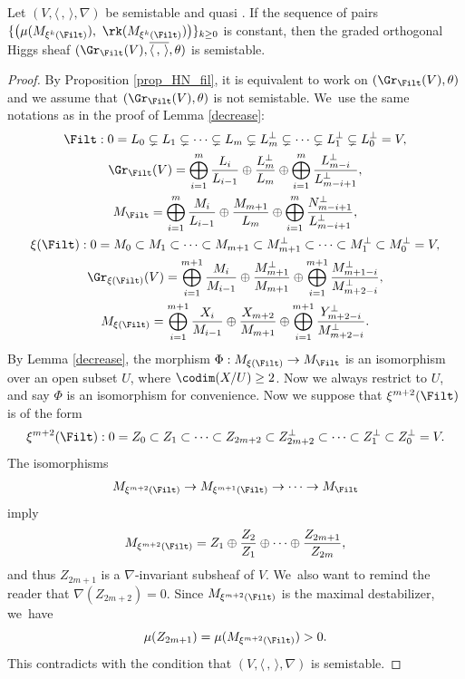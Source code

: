 \begin{lem}\label{lem_const}
Let $(V, \langle \,, \, \rangle, \nabla)$ be semistable and quasi \grsemistable. If the sequence of pairs $\{\big(\mu(M_{\xi^k(\Filt)}),\ \rk(M_{\xi^k(\Filt)})\big)\}_{k\geq 0}$ is constant, then the graded orthogonal Higgs sheaf $(\Gr_{\Filt}(V), \overline{\langle \,, \, \rangle}, \theta)$ is semistable.
\end{lem}

\begin{proof}
By Proposition \ref{prop_HN_fil}, it is equivalent to work on $(\Gr_{\Filt}(V), \theta)$ and we assume that $(\Gr_{\Filt}(V), \theta)$ is not semistable. We~use the same notations as in the proof of Lemma \ref{decrease}:
\begin{gather*}
\Filt: 0= L_0 \subsetneq L_1 \subsetneq \cdots \subsetneq L_m \subsetneq L_m^\perp\subsetneq\cdots \subsetneq L_1^\perp\subsetneq L_0^\perp= V,
\\
\Gr_{\Filt}(V)=\mathop{\bigoplus}_{i=1}^{m} \frac{L_i}{L_{i-1}}\oplus \frac{L_m^\perp}{L_m}\oplus \mathop{\bigoplus}_{i=1}^{m} \frac{L_{m-i}^\perp}{L_{m-i+1}^\perp},
\\
M_{\Filt}=\mathop{\bigoplus}_{i=1}^{m} \frac{M_i}{L_{i-1}}\oplus \frac{M_{m+1}}{L_m}\oplus \mathop{\bigoplus}_{i=1}^{m} \frac{N_{m-i+1}^\perp}{L_{m-i+1}^\perp},
\\
\xi(\Filt):0=M_0\subset M_1\subset\cdots\subset M_{m+1}\subset M_{m+1}^\perp\subset\cdots\subset M_1^\perp\subset M_0^\perp=V,
\\
\Gr_{\xi(\Filt)}(V)=\mathop{\bigoplus}_{i=1}^{m+1} \frac{M_i}{M_{i-1}}\oplus \frac{M_{m+1}^\perp}{M_{m+1}}\oplus \mathop{\bigoplus}_{i=1}^{m+1} \frac{M_{m+1-i}^\perp}{M_{m+2-i}^\perp},
\\
M_{\xi(\Filt)}=\mathop{\bigoplus}_{i=1}^{m+1} \frac{X_i}{M_{i-1}}\oplus \frac{X_{m+2}}{M_{m+1}}\oplus \mathop{\bigoplus}_{i=1}^{m+1} \frac{Y_{m+2-i}^\perp}{M_{m+2-i}^\perp}.
\end{gather*}
By Lemma \ref{decrease}, the morphism $\Phi:M_{\xi(\Filt)}\to M_{\Filt}$ is an isomorphism over an open subset $U$, where $\codim(X/U) \geq 2$. Now we always restrict to $U$, and say $\Phi$ is an isomorphism for convenience. Now we suppose that $\xi^{m+2}(\Filt)$ is of the form
\[
\xi^{m+2}(\Filt): 0= Z_0 \subset Z_1 \subset \cdots \subset Z_{2m+2}\subset Z_{2m+2}^\perp\subset\cdots \subset Z_1^\perp\subset Z_0^\perp= V.
\]
The isomorphisms
\begin{align*}
M_{\xi^{m+2}(\Filt)} \to M_{\xi^{m+1}(\Filt)} \to \cdots \to M_{\Filt}
\end{align*}
imply
\[
M_{\xi^{m+2}(\Filt)}=Z_1\oplus \frac{Z_2}{Z_1}\oplus\cdots\oplus \frac{Z_{2m+1}}{Z_{2m}},
\]
and thus $Z_{2m+1}$ is a $\nabla$-invariant subsheaf of $V$. We~also want to remind the reader that $\nabla(Z_{2m+2}) = 0$. Since $M_{\xi^{m+2}(\Filt)}$ is the maximal destabilizer, we~have
\[
\mu(Z_{2m+1})=\mu(M_{\xi^{m+2}(\Filt)})>0.
\]
This contradicts with the condition that $(V,\langle \,, \, \rangle,\nabla)$ is semistable.
\end{proof}

